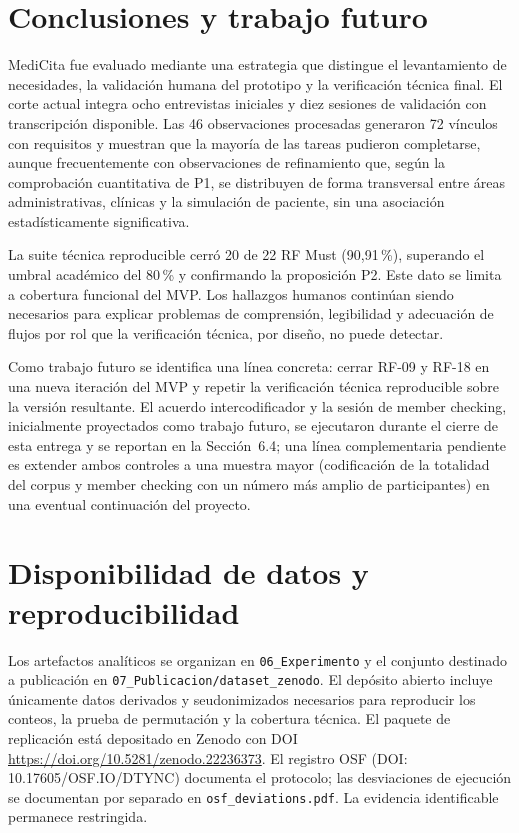 \documentclass[runningheads]{llncs}
\begin{document}
	\section{Conclusiones y trabajo futuro}
	MediCita fue evaluado mediante una estrategia que distingue el levantamiento de necesidades, la validación humana del prototipo y la verificación técnica final. El corte actual integra ocho entrevistas iniciales y diez sesiones de validación con transcripción disponible. Las 46 observaciones procesadas generaron 72 vínculos con requisitos y muestran que la mayoría de las tareas pudieron completarse, aunque frecuentemente con observaciones de refinamiento que, según la comprobación cuantitativa de P1, se distribuyen de forma transversal entre áreas administrativas, clínicas y la simulación de paciente, sin una asociación estadísticamente significativa.
	
	La suite técnica reproducible cerró 20 de 22 RF Must (90,91\,\%), superando el umbral académico del 80\,\% y confirmando la proposición P2. Este dato se limita a cobertura funcional del MVP. Los hallazgos humanos continúan siendo necesarios para explicar problemas de comprensión, legibilidad y adecuación de flujos por rol que la verificación técnica, por diseño, no puede detectar.
	
	Como trabajo futuro se identifica una línea concreta: cerrar RF-09 y RF-18 en una nueva iteración del MVP y repetir la verificación técnica reproducible sobre la versión resultante. El acuerdo intercodificador y la sesión de member checking, inicialmente proyectados como trabajo futuro, se ejecutaron durante el cierre de esta entrega y se reportan en la Sección~6.4; una línea complementaria pendiente es extender ambos controles a una muestra mayor (codificación de la totalidad del corpus y member checking con un número más amplio de participantes) en una eventual continuación del proyecto.
	
	\section{Disponibilidad de datos y reproducibilidad}
	Los artefactos analíticos se organizan en \texttt{06\_Experimento} y el conjunto destinado a publicación en \texttt{07\_Publicacion/dataset\_zenodo}. El depósito abierto incluye únicamente datos derivados y seudonimizados necesarios para reproducir los conteos, la prueba de permutación y la cobertura técnica. El paquete de replicación está depositado en Zenodo con DOI \url{https://doi.org/10.5281/zenodo.22236373}. El registro OSF (DOI: 10.17605/OSF.IO/DTYNC) documenta el protocolo; las desviaciones de ejecución se documentan por separado en \texttt{osf\_deviations.pdf}. La evidencia identificable permanece restringida.
	
\end{document}

